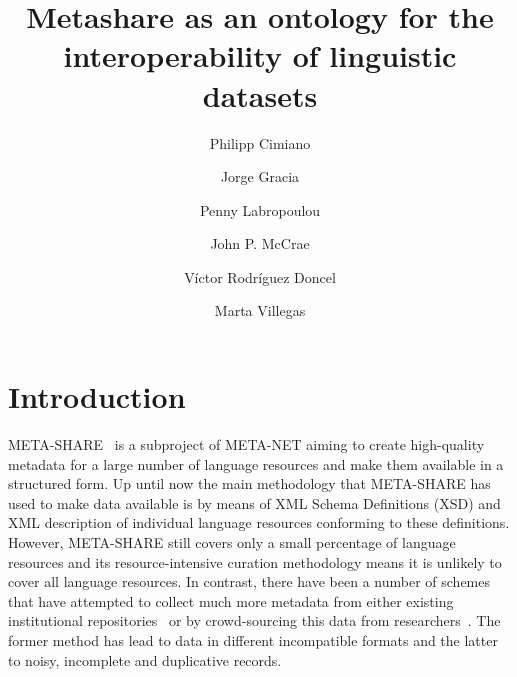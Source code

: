 \documentclass{llncs}
\begin{document}
\title{Metashare as an ontology for the interoperability of linguistic datasets}

%
%

\author{Philipp Cimiano \and Jorge Gracia \and Penny Labropoulou \and John P. McCrae \and V\'ictor Rodr\'iguez Doncel \and Marta Villegas}
%
%
%
    
\maketitle              %

\begin{abstract}
\end{abstract}

\section{Introduction}
\label{sec:introduction}

META-SHARE~\cite{piperidis2012meta} is a subproject of META-NET aiming to create high-quality metadata
for a large number of language resources and make them available in a structured
form. Up until now the main methodology that META-SHARE has used to make data
available is by means of XML Schema Definitions (XSD) and XML description of
individual language resources conforming to these definitions. However,
META-SHARE still covers only a small percentage of language resources and its
resource-intensive curation methodology means it is unlikely to cover all
language resources. In contrast, there have been a number of schemes that have
attempted to collect much more metadata from either existing institutional
repositories~\cite[CLARIN]{broeder2010data} or by crowd-sourcing this data from
researchers~\cite[LRE-Map]{calzolari2012lre}. The former method has lead to
data in different incompatible formats and the latter to noisy, incomplete and
duplicative records.
\end{document}
